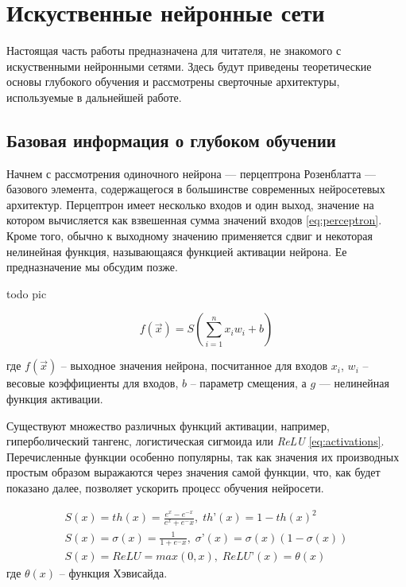 \section{Искуственные нейронные сети}

\indent
\indent
Настоящая часть работы предназначена для читателя, не знакомого с 
искуственными нейронными сетями. Здесь будут приведены теоретические 
основы глубокого обучения и рассмотрены сверточные архитектуры, 
используемые в дальнейшей работе.

\subsection{Базовая информация о глубоком обучении}

\indent
\indent
Начнем с рассмотрения одиночного нейрона
 --- перцептрона Розенблатта --- базового элемента, содержащегося в большинстве современных нейросетевых архитектур.
Перцептрон имеет несколько входов и один выход, значение на котором
вычисляется как взвешенная сумма значений входов \ref{eq:perceptron}.
Кроме того, обычно
к выходному значению применяется сдвиг и некоторая нелинейная функция, 
называющаяся функцией активации нейрона. Ее предназначение мы обсудим позже.

todo pic

\begin{equation}\label{eq:perceptron}
    f(\vec{x}) = S(\sum_{i=1}^n x_i w_i + b)
\end{equation}

где $f(\vec{x})$ -- выходное значения нейрона, посчитанное для входов $x_i$,
$w_i$ -- весовые коэффициенты для входов, $b$ -- параметр смещения, 
а $g$ --- нелинейная функция активации.

\indent
\indent
Существуют множество различных функций активации, например, гиперболический
тангенс, логистическая сигмоида или \textit{ReLU} \ref{eq:activations}. Перечисленные
функции особенно популярны, так как значения их производных простым образом 
выражаются через значения самой функции, что, как будет показано далее, позволяет
ускорить процесс обучения нейросети.


\begin{equation}\label{eq:activations}
	\begin{gathered}
	    S(x) = th(x) = \frac{e^x - e^{-x}}{e^x + e^-x},    \;   th’(x) = 1 - th(x)^2   \\    
	    S(x) = \sigma(x) = \frac{1}{1 + e^-x},   \;   \sigma’(x) = \sigma(x)(1 - \sigma(x)) \\
	    S(x) = ReLU = max(0, x),   \;   ReLU’(x) = \theta(x)
	\end{gathered}
\end{equation}
где $\theta(x)$ -- функция Хэвисайда.


